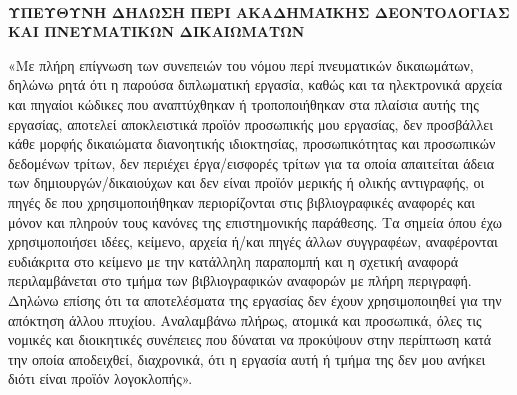 \thispagestyle{plain}
~\vspace{2cm}
\begin{center}\large\bf
ΥΠΕΥΘΥΝΗ ΔΗΛΩΣΗ ΠΕΡΙ ΑΚΑΔΗΜΑΪΚΗΣ ΔΕΟΝΤΟΛΟΓΙΑΣ\\ΚΑΙ ΠΝΕΥΜΑΤΙΚΩΝ ΔΙΚΑΙΩΜΑΤΩΝ
\end{center}
\vspace{2cm}
«Με πλήρη επίγνωση των συνεπειών του νόμου περί πνευματικών δικαιωμάτων, δηλώνω ρητά ότι η παρούσα διπλωματική εργασία, καθώς και τα ηλεκτρονικά αρχεία και πηγαίοι κώδικες που αναπτύχθηκαν ή τροποποιήθηκαν στα πλαίσια αυτής της εργασίας, αποτελεί αποκλειστικά προϊόν προσωπικής μου εργασίας, δεν προσβάλλει κάθε μορφής δικαιώματα διανοητικής ιδιοκτησίας, προσωπικότητας και προσωπικών δεδομένων τρίτων, δεν περιέχει έργα/εισφορές τρίτων για τα οποία απαιτείται άδεια των δημιουργών/δικαιούχων και δεν είναι προϊόν μερικής ή ολικής αντιγραφής, οι πηγές δε που χρησιμοποιήθηκαν περιορίζονται στις βιβλιογραφικές αναφορές και μόνον και πληρούν τους κανόνες της επιστημονικής παράθεσης. Τα σημεία όπου έχω χρησιμοποιήσει ιδέες, κείμενο, αρχεία ή/και πηγές άλλων συγγραφέων, αναφέρονται ευδιάκριτα στο κείμενο με την κατάλληλη παραπομπή και η σχετική αναφορά περιλαμβάνεται στο τμήμα των βιβλιογραφικών αναφορών με πλήρη περιγραφή. Δηλώνω επίσης ότι τα αποτελέσματα της εργασίας δεν έχουν χρησιμοποιηθεί για την απόκτηση άλλου πτυχίου. Αναλαμβάνω πλήρως, ατομικά και προσωπικά, όλες τις νομικές και διοικητικές συνέπειες που δύναται να προκύψουν στην περίπτωση κατά την οποία αποδειχθεί, διαχρονικά, ότι η εργασία αυτή ή τμήμα της δεν μου ανήκει διότι είναι προϊόν λογοκλοπής». 
\vspace{1cm}

\noindent{}
\vspace{1.7cm}


\noindent\authorname 
{}

